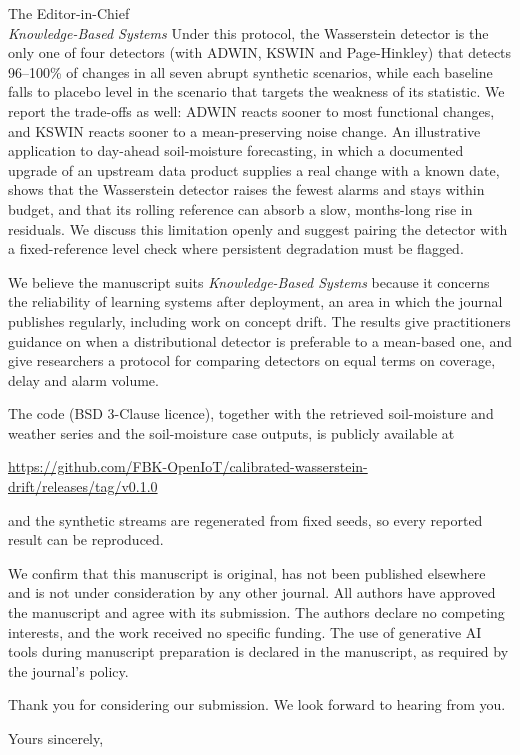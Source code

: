 \documentclass[11pt,a4paper]{letter}
\begin{document}
\begin{letter}{The Editor-in-Chief\\
\textit{Knowledge-Based Systems}}
Under this protocol, the Wasserstein detector is the only one of four detectors (with ADWIN, KSWIN and Page-Hinkley) that detects 96--100\% of changes in all seven abrupt synthetic scenarios, while each baseline falls to placebo level in the scenario that targets the weakness of its statistic. We report the trade-offs as well: ADWIN reacts sooner to most functional changes, and KSWIN reacts sooner to a mean-preserving noise change. An illustrative application to day-ahead soil-moisture forecasting, in which a documented upgrade of an upstream data product supplies a real change with a known date, shows that the Wasserstein detector raises the fewest alarms and stays within budget, and that its rolling reference can absorb a slow, months-long rise in residuals. We discuss this limitation openly and suggest pairing the detector with a fixed-reference level check where persistent degradation must be flagged.

We believe the manuscript suits \textit{Knowledge-Based Systems} because it concerns the reliability of learning systems after deployment, an area in which the journal publishes regularly, including work on concept drift. The results give practitioners guidance on when a distributional detector is preferable to a mean-based one, and give researchers a protocol for comparing detectors on equal terms on coverage, delay and alarm volume.

The code (BSD 3-Clause licence), together with the retrieved soil-moisture and weather series and the soil-moisture case outputs, is publicly available at
\begin{center}
\url{https://github.com/FBK-OpenIoT/calibrated-wasserstein-drift/releases/tag/v0.1.0}
\end{center}
and the synthetic streams are regenerated from fixed seeds, so every reported result can be reproduced.

We confirm that this manuscript is original, has not been published elsewhere and is not under consideration by any other journal. All authors have approved the manuscript and agree with its submission. The authors declare no competing interests, and the work received no specific funding. The use of generative AI tools during manuscript preparation is declared in the manuscript, as required by the journal's policy.

Thank you for considering our submission. We look forward to hearing from you.

\closing{Yours sincerely,}

\end{letter}
\end{document}
